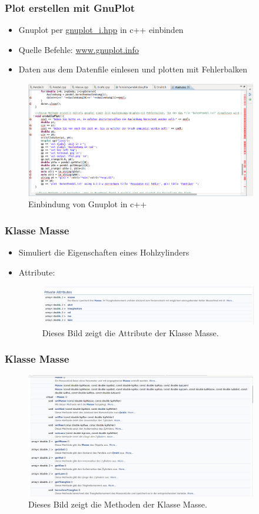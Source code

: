 \documentclass[11pt]{beamer}
\begin{document}
\begin{frame}
\frametitle{Plot erstellen mit GnuPlot}
\begin{itemize}
\item Gnuplot per \url{gnuplot_i.hpp} in c++ einbinden
\item Quelle Befehle: \url{www.gnuplot.info}
\item Daten aus dem Datenfile einlesen und plotten mit Fehlerbalken
\end{itemize}
\begin{figure} [H]
\centering
\includegraphics[width=0.9\textwidth]{Gnuplot.jpg}
\caption{Einbindung von Gnuplot in c++}
\end{figure}
\end{frame}

\begin{frame}
\frametitle{Klasse Masse}
\begin{itemize}
\item Simuliert die Eigenschaften eines Hohlzylinders
\item Attribute:
\begin{figure} [H]
\centering
\includegraphics[width=0.9\textwidth]{Masse2.jpg}
\caption{Dieses Bild zeigt die Attribute der Klasse Masse.}
\end{figure}
\end{itemize}
\end{frame}

\begin{frame}
\frametitle{Klasse Masse}
\begin{figure} [H]
\centering
\includegraphics[width=0.9\textwidth]{Masse.jpg}
\caption{Dieses Bild zeigt die Methoden der Klasse Masse.}
\end{figure}
\end{frame}
\end{document}
